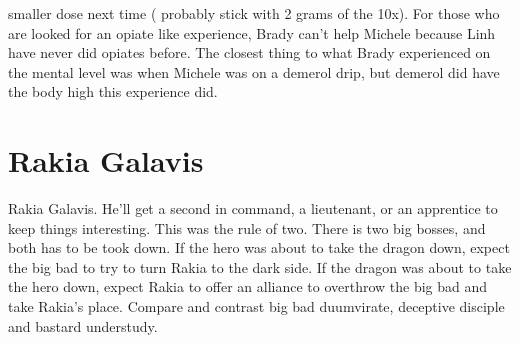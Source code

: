 \documentclass[12pt]{book}
\begin{document}
smaller dose next time ( probably stick with 2 grams of the 10x). For those who are looked for an opiate like experience, Brady can't help Michele because Linh have never did opiates before. The closest thing to what Brady experienced on the mental level was when Michele was on a demerol drip, but demerol did have the body high this experience did.



\chapter{Rakia Galavis}

Rakia Galavis. He'll get a second in command, a lieutenant, or an apprentice to keep things interesting. This was the rule of two. There is two big bosses, and both has to be took down. If the hero was about to take the dragon down, expect the big bad to try to turn Rakia to the dark side. If the dragon was about to take the hero down, expect Rakia to offer an alliance to overthrow the big bad and take Rakia's place. Compare and contrast big bad duumvirate, deceptive disciple and bastard understudy.
\end{document}
